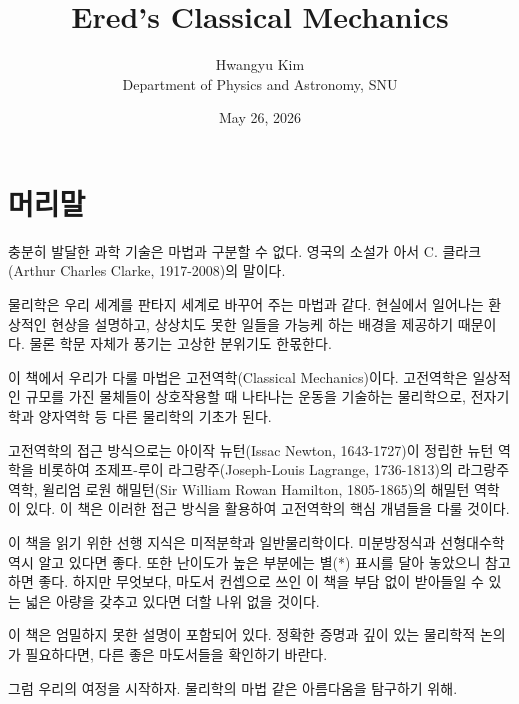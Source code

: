 \documentclass[chapter, oneside, b5paper]{oblivoir}
\title{\Huge \textbf{Ered's Classical Mechanics}}
\author{Hwangyu Kim \\ \small Department of Physics and Astronomy, SNU}
\date{May 26, 2026}
\theoremstyle{plain}
\theoremstyle{definition}
\theoremstyle{remark}
\begin{document}
\maketitle
\thispagestyle{empty} %
\newpage


\chapter*{머리말}

충분히 발달한 과학 기술은 마법과 구분할 수 없다. 영국의 소설가 아서 C. 클라크(Arthur Charles Clarke, 1917-2008)의 말이다.

물리학은 우리 세계를 판타지 세계로 바꾸어 주는 마법과 같다. 현실에서 일어나는 환상적인 현상을 설명하고, 상상치도 못한 일들을 가능케 하는 배경을 제공하기 때문이다. 물론 학문 자체가 풍기는 고상한 분위기도 한몫한다.

이 책에서 우리가 다룰 마법은 고전역학(Classical Mechanics)이다. 고전역학은 일상적인 규모를 가진 물체들이 상호작용할 때 나타나는 운동을 기술하는 물리학으로, 전자기학과 양자역학 등 다른 물리학의 기초가 된다.

고전역학의 접근 방식으로는 아이작 뉴턴(Issac Newton, 1643-1727)이 정립한 뉴턴 역학을 비롯하여 조제프-루이 라그랑주(Joseph-Louis Lagrange, 1736-1813)의 라그랑주 역학, 윌리엄 로원 해밀턴(Sir William Rowan Hamilton, 1805-1865)의 해밀턴 역학이 있다. 이 책은 이러한 접근 방식을 활용하여 고전역학의 핵심 개념들을 다룰 것이다. 

이 책을 읽기 위한 선행 지식은 미적분학과 일반물리학이다. 미분방정식과 선형대수학 역시 알고 있다면 좋다. 또한 난이도가 높은 부분에는 별(*) 표시를 달아 놓았으니 참고하면 좋다. 하지만 무엇보다, 마도서 컨셉으로 쓰인 이 책을 부담 없이 받아들일 수 있는 넓은 아량을 갖추고 있다면 더할 나위 없을 것이다.

이 책은 엄밀하지 못한 설명이 포함되어 있다. 정확한 증명과 깊이 있는 물리학적 논의가 필요하다면, 다른 좋은 마도서들을 확인하기 바란다.

그럼 우리의 여정을 시작하자. 물리학의 마법 같은 아름다움을 탐구하기 위해.
\newpage

\tableofcontents
\newpage

\setcounter{page}{1}
\end{document}
